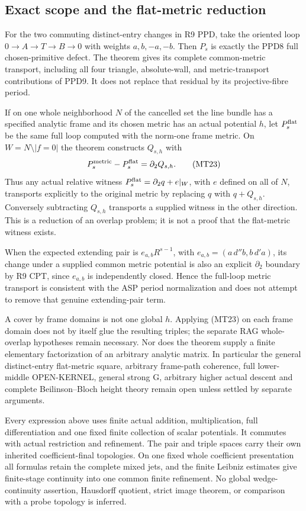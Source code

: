 \subsection{Exact scope and the flat-metric reduction}

For the two commuting distinct-entry changes in R9 PPD, take the
oriented loop $0\to A\to T\to B\to0$ with weights
$a,b,-a,-b$.  Then $P_s$ is exactly the PPD8 full chosen-primitive
defect.  The theorem gives its complete common-metric transport,
including all four triangle, absolute-wall, and metric-transport
contributions of PPD9.  It does not replace that residual by its
projective-fibre period.

If on one whole neighborhood $N$ of the cancelled set the line bundle
has a specified analytic frame and its chosen metric has an actual
potential $h$, let $P_s^{\rm flat}$ be the same full loop computed
with the norm-one frame metric.  On $W=N\setminus|f=0|$ the theorem
constructs $Q_{s,h}$ with
\[
                  P_s^{\rm metric}-P_s^{\rm flat}
                                            =\partial_2Q_{s,h}.
 \tag{MT23}
\]
Thus any actual relative witness
$P_s^{\rm flat}=\partial_2q+e|_W$, with $e$ defined on all of $N$,
transports explicitly to the original metric by replacing $q$ with
$q+Q_{s,h}$.  Conversely subtracting $Q_{s,h}$ transports a supplied
witness in the other direction.  This is a reduction of an overlap
problem; it is not a proof that the flat-metric witness exists.

When the expected extending pair is
$e_{a,b}R^{s-1}$, with
$e_{a,b}=(a\,d''b,b\,d'a)$, its change under a supplied common
metric potential is also an explicit $\partial_2$ boundary by
R9 CPT, since $e_{a,b}$ is independently closed.  Hence the full-loop
metric transport is consistent with the ASP period normalization
and does not attempt to remove that genuine extending-pair term.

A cover by frame domains is not one global $h$.  Applying (MT23)
on each frame domain does not by itself glue the resulting triples;
the separate RAG whole-overlap hypotheses remain necessary.  Nor
does the theorem supply a finite elementary factorization of an
arbitrary analytic matrix.  In particular the general distinct-entry
flat-metric square, arbitrary frame-path coherence, full lower-middle
OPEN-KERNEL, general strong G, arbitrary higher actual descent and
complete Beilinson--Bloch height theory remain open unless settled
by separate arguments.

Every expression above uses finite actual addition, multiplication,
full differentiation and one fixed finite collection of scalar
potentials.  It commutes with actual restriction and refinement.
The pair and triple spaces carry their own inherited coefficient-final
topologies.  On one fixed whole coefficient presentation all formulas
retain the complete mixed jets, and the finite Leibniz estimates give
finite-stage continuity into one common finite refinement.  No global
wedge-continuity assertion, Hausdorff quotient, strict image theorem,
or comparison with a probe topology is inferred.

